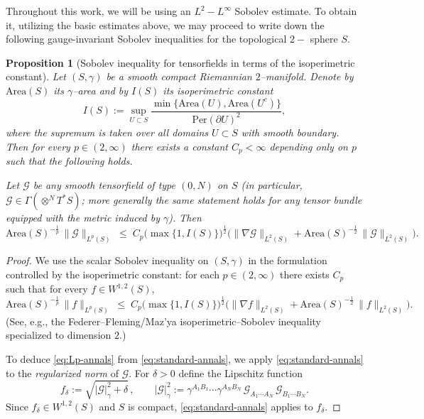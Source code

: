 \documentclass{amsart}
\newtheorem{proposition}{Proposition}[section]
\begin{document}
{\noindent Throughout this work, we will be using an $L^2-L^{\infty}$ Sobolev estimate. To obtain it, utilizing the basic estimates above, we may proceed to write down the following gauge-invariant Sobolev inequalities for the topological $2-$ sphere $S$.\\
\begin{proposition}[Sobolev inequality for tensorfields in terms of the isoperimetric constant]
\label{prop:sobolev-tensor-isoper}
Let $(S,\gamma)$ be a smooth compact Riemannian $2$--manifold. Denote by $\text{Area}(S)$ its $\gamma$--area and by $I(S)$ its isoperimetric constant
\[
I(S):=\sup_{U\subset S}\frac{\min\{\text{Area}(U),\text{Area}(U^c)\}}{\text{Per}(\partial U)^2},
\]
where the supremum is taken over all domains $U\subset S$ with smooth boundary.
Then for every $p\in(2,\infty)$ there exists a constant $C_p<\infty$ depending only on $p$ such that the following holds.

\noindent Let $\mathcal G$ be any smooth tensorfield of type $(0,N)$ on $S$ (in particular, $\mathcal G\in\Gamma(\otimes^N T^*S)$; more generally the same statement holds for any tensor bundle equipped with the metric induced by $\gamma$). Then
\begin{equation}\label{eq:Lp-annals}
\text{Area}(S)^{-\frac1p}\,\|\mathcal G\|_{L^p(S)}
\;\le\;
C_p\big(\max\{1,I(S)\}\big)^{\frac12}
\Big(
\|\nabla \mathcal G\|_{L^2(S)}
+
\text{Area}(S)^{-\frac12}\,\|\mathcal G\|_{L^2(S)}
\Big).
\end{equation}
\end{proposition}

\begin{proof}
We use the scalar Sobolev inequality on $(S,\gamma)$ in the formulation controlled by the isoperimetric constant: for each $p\in(2,\infty)$ there exists $C_p$ such that for every $f\in W^{1,2}(S)$,
\begin{equation}\label{eq:standard-annals}
\text{Area}(S)^{-\frac1p}\,\|f\|_{L^p(S)}
\;\le\;
C_p\big(\max\{1,I(S)\}\big)^{\frac12}
\Big(
\|\nabla f\|_{L^2(S)}
+
\text{Area}(S)^{-\frac12}\,\|f\|_{L^2(S)}
\Big).
\end{equation}
(See, e.g., the Federer--Fleming/Maz'ya isoperimetric--Sobolev inequality specialized to dimension $2$.)

\medskip
\noindent To deduce \eqref{eq:Lp-annals} from \eqref{eq:standard-annals}, we apply \eqref{eq:standard-annals} to the \emph{regularized norm} of $\mathcal G$.
For $\delta>0$ define the Lipschitz function
\[
f_\delta:=\sqrt{|\mathcal G|_\gamma^{2}+\delta}\,,
\qquad
|\mathcal G|_\gamma^{2}
:=
\gamma^{A_1B_1}\cdots\gamma^{A_NB_N}\,
\mathcal G_{A_1\cdots A_N}\,\mathcal G_{B_1\cdots B_N}.
\]
Since $f_\delta\in W^{1,2}(S)$ and $S$ is compact, \eqref{eq:standard-annals} applies to $f_\delta$.


\end{proof}}
\end{document}
